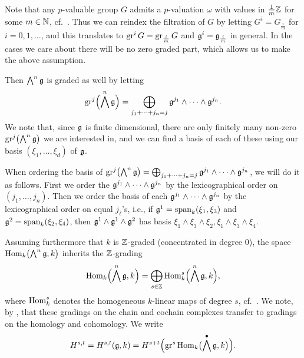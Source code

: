 \begin{remark}\label{rem:g-Z-grading}
  Note that any $p$-valuable group $G$ admits a $p$-valuation $\omega$ with values in $\frac{1}{m}\mathbb{Z}$ for some $m \in \mathbb{N}$, cf.\ \cite[Cor.~33.3]{Sch}. Thus we can reindex the filtration of $G$ by letting $G^{i} = G_{\frac{i}{m}}$ for $i=0,1,\dotsc$, and this translates to $\operatorname{gr}^{i} G = \operatorname{gr}_{\frac{i}{m}} G$ and $\mathfrak{g}^{i} = \mathfrak{g}_{\frac{i}{m}}$ in general. In the cases we care about there will be no zero graded part, which allows us to make the above assumption.
\end{remark}

Then $\bigwedge^{n} \mathfrak{g}$ is graded as well by letting
\begin{equation*}
  \operatorname{gr}^{j}\Bigl( \bigwedge^{n}\mathfrak{g} \Bigr) = \bigoplus_{j_{1} + \dotsb + j_{n} = j} \mathfrak{g}^{j_{1}} \wedge \dotsb \wedge \mathfrak{g}^{j_{n}}.
\end{equation*}
We note that, since $\mathfrak{g}$ is finite dimensional, there are only finitely many non-zero $\operatorname{gr}^{j}\bigl( \bigwedge^{n} \mathfrak{g} \bigr)$ we are interested in, and we can find a basis of each of these using our basis $(\xi_{1},\dotsc,\xi_{d})$ of $\mathfrak{g}$.

\begin{remark}
  When ordering the basis of $\operatorname{gr}^{j} \bigl( \bigwedge^{n}\mathfrak{g} \bigr) = \bigoplus_{j_{1} + \dotsb + j_{n} = j} \mathfrak{g}^{j_{1}} \wedge \dotsb \wedge \mathfrak{g}^{j_{n}}$, we will do it as follows. First we order the $\mathfrak{g}^{j_{1}} \wedge \dotsb \wedge \mathfrak{g}^{j_{n}}$ by the lexicographical order on $(j_{1},\dotsc,j_{n})$. Then we order the basis of each $\mathfrak{g}^{j_{1}} \wedge \dotsb \wedge \mathfrak{g}^{j_{n}}$ by the lexicographical order on equal $j_{\ell}$'s, i.e., if $\mathfrak{g}^{1} = \operatorname{span}_{k}(\xi_{1},\xi_{3})$ and $\mathfrak{g}^{2} = \operatorname{span}_{k}(\xi_{2},\xi_{4})$, then $\mathfrak{g}^{1} \wedge \mathfrak{g}^{1} \wedge \mathfrak{g}^{2}$ has basis $\xi_{1} \wedge \xi_{3} \wedge \xi_{2}, \xi_{1} \wedge \xi_{3} \wedge \xi_{4}$.
\end{remark}

Assuming furthermore that $k$ is $\mathbb{Z}$-graded (concentrated in degree $0$), the space $\operatorname{Hom}_{k}\bigl( \bigwedge^{n}\mathfrak{g}, k \bigr)$ inherits the $\mathbb{Z}$-grading
\[
  \operatorname{Hom}_{k}\Bigl( \bigwedge^n \mathfrak{g}, k \Bigr) = \bigoplus_{s \in \mathbb{Z}} \operatorname{Hom}_{k}^s\Bigl( \bigwedge^n\mathfrak{g}, k \Bigr),
\]
where $\operatorname{Hom}_{k}^s$ denotes the homogeneous $k$-linear maps of degree $s$, cf.\ \cite[Lem.~4.2]{Fossum}. We note, by \cite[Chap.~1~§3.7]{Fuks}, that these gradings on the chain and cochain complexes transfer to gradings on the homology and cohomology. We write
\begin{equation*}
  H^{s,t} = H^{s,t}(\mathfrak{g}, k) = H^{s+t}\Bigl( \operatorname{gr}^s \operatorname{Hom}_{k}\bigl(\bigwedge^{\bullet} \mathfrak{g}, k\bigr) \Bigr).
\end{equation*}%
%

